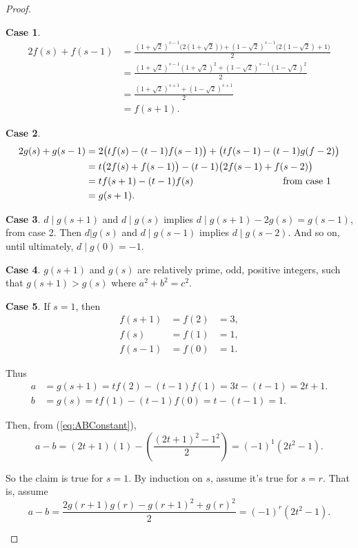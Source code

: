 \documentclass{article}
\theoremstyle{definition}
\newtheorem{case}{Case}[section]
\begin{document}
\begin{proof}
\begin{case}
\[\begin{aligned} 2 f(s)+f(s-1) &= \frac{(1+\sqrt{2})^{s-1} \big(2(1+\sqrt{2})\big) + (1-\sqrt{2})^{s-1} \big(2(1-\sqrt{2})+1\big)}{2} \\   
&= \frac{(1+\sqrt{2})^{s-1} (1+\sqrt{2})^2 + (1-\sqrt{2})^{s-1} (1-\sqrt{2})^2}{2} \\
&= \frac{(1+\sqrt{2})^{s+1} + (1-\sqrt{2})^{s+1}}{2} \\ &= f(s+1). \end{aligned} \]
\end{case}
\begin{case}
\[\begin{aligned}
2 g(s)+g(s-1) &= 2\big(t f(s)-(t-1) f(s-1)\big) + \big(t f(s-1)-(t-1) g(f-2)\big) \\ &= t\big(2 f(s)+f(s-1)\big)-(t-1)\big(2 f(s-1)+f(s-2)\big) \\ &= t f(s+1)-(t-1) f(s) \hskip0.27\textwidth \text{from case 1} \\ &= g(s+1).
\end{aligned}\]
\end{case}
\begin{case}
\(d\mid g(s+1)\) and \(d\mid g(s)\) implies  \(d\mid g(s+1)-2 g(s)=g(s-1)\), from case 2. Then \(d\vert g(s)\) and \(d\mid g(s-1)\) implies  \(d\mid g(s-2)\). And so on, until ultimately, \(d\mid g(0)=-1\).
\end{case}
\begin{case}
\(g(s+1)\) and \(g(s)\) are relatively prime, odd, positive integers, such that \(g(s+1)>g(s)\) where \(a^2+b^2=c^2\).
\end{case}
\begin{case}
If \(s=1\), then
\[\begin{aligned}
f(s+1) &= f(2) &=3, \\
f(s) &= f(1) &=1, \\
f(s-1) &= f(0) &=1.
\end{aligned}\]

Thus
\[\begin{aligned}
a &= g(s+1) = t f(2)-(t-1) f(1) = 3t-(t-1) = 2t+1. \\
b &= g(s)= t f(1)-(t-1) f(0) = t-(t-1) = 1.
\end{aligned}\]

Then, from (\ref{eq:ABConstant}), \[ a-b = (2t+1)(1) -\left( \frac{(2t+1)^2-1^2}{2} \right) = (-1)^1 \left(2t^2-1\right).
\]

So the claim is true for \(s = 1\). By induction on \(s\), assume it's true for \(s = r\). That is, assume \[ a-b = \frac{2 g(r+1) g(r)-g(r+1)^2+g(r)^2}{2} = (-1)^r(2t^2-1). \]


\end{case}
\end{proof}
\end{document}
